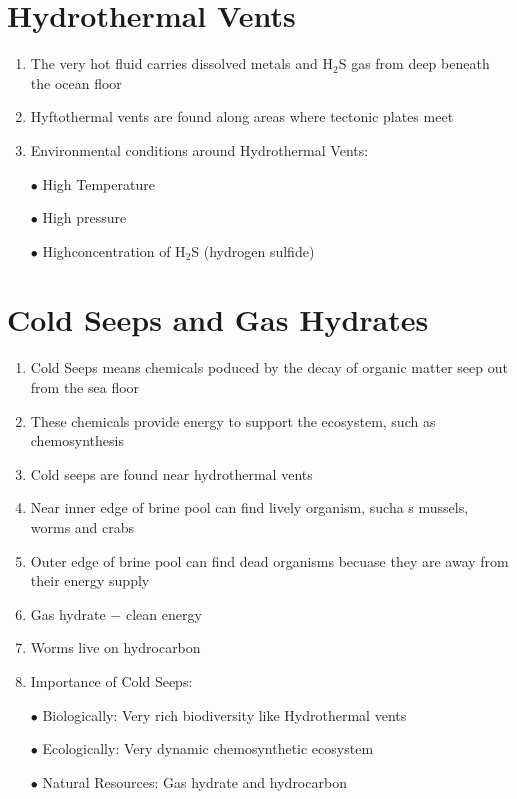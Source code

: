 \documentclass{report}
\begin{document}
\section{Hydrothermal Vents}
\begin{enumerate}
    \item The very hot fluid carries dissolved metals and H$_{2}$S gas from deep beneath the ocean floor 
    \item Hyftothermal vents are found along areas where tectonic plates meet 
    \item Environmental conditions around Hydrothermal Vents:
    \item [$\bullet$]High Temperature
    \item [$\bullet$]High pressure 
    \item [$\bullet$]Highconcentration of H$_{2}$S (hydrogen sulfide)
\end{enumerate}


\section{Cold Seeps and Gas Hydrates}
\begin{enumerate}
    \item Cold Seeps means chemicals poduced by the decay of organic matter seep out from the sea floor 
    \item These chemicals provide energy to support the ecosystem, such as chemosynthesis
    \item Cold seeps are found near hydrothermal vents 
    \item Near inner edge of brine pool can find lively organism, sucha s mussels, worms and crabs
    \item Outer edge of brine pool can find dead organisms becuase they are away from their energy supply
    \item Gas hydrate $-$ clean energy
    \item Worms live on hydrocarbon 
    \item Importance of Cold Seeps:
    \item [$\bullet$]Biologically: Very rich biodiversity like Hydrothermal vents 
    \item [$\bullet$]Ecologically: Very dynamic chemosynthetic ecosystem
    \item [$\bullet$]Natural Resources: Gas hydrate and hydrocarbon 
\end{enumerate}
\end{document}
